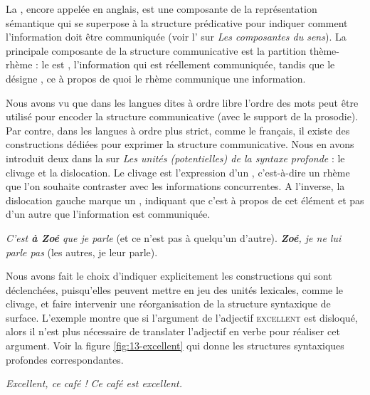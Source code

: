 {La , encore appelée  en anglais, est une composante de la représentation sémantique qui se superpose à la structure prédicative pour indiquer comment l’information doit être communiquée (voir l’ sur \textit{Les composantes du sens}). La principale composante de la structure communicative est la partition thème-rhème : le  est , l’information qui est réellement communiquée, tandis que le  désigne , ce à propos de quoi le rhème communique une information.  

Nous avons vu que dans les langues dites à ordre libre l’ordre des mots peut être utilisé pour encoder la structure communicative (avec le support de la prosodie). Par contre, dans les langues à ordre plus strict, comme le français, il existe des constructions dédiées pour exprimer la structure communicative. Nous en avons introduit deux dans la  sur \textit{Les unités (potentielles) de la syntaxe profonde} : le clivage et la dislocation. Le clivage est l’expression d’un , c’est-à-dire un rhème que l’on souhaite contraster avec les informations concurrentes. A l’inverse, la dislocation gauche marque un , indiquant que c’est à propos de cet élément et pas d’un autre que l’information est communiquée.

\ea
\ea \textit{C’est \textbf{à Zoé} que je parle} (et ce n’est pas à quelqu’un d’autre).
\ex \textit{\textbf{Zoé}, je ne lui parle pas} (les autres, je leur parle).\z\z

Nous avons fait le choix d’indiquer explicitement les constructions qui sont déclenchées, puisqu’elles peuvent mettre en jeu des unités lexicales, comme le clivage, et faire intervenir une réorganisation de la structure syntaxique de surface. L’exemple  montre que si l’argument de l’adjectif \textsc{excellent} est disloqué, alors il n’est plus nécessaire de translater l’adjectif en verbe pour réaliser cet argument. Voir la figure \ref{fig:13-excellent} qui donne les structures syntaxiques profondes correspondantes.

\ea\label{ex:13-excellent}
\ea \textit{Excellent, ce café !}
\ex \textit{Ce café est excellent.}\z\z

}
